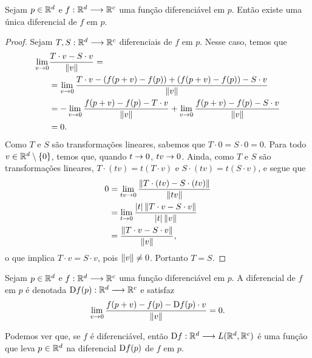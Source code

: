 \begin{prop}
Sejam $p \in \mathbb{R}^d$ e $f:\mathbb{R}^d \longrightarrow \mathbb{R}^c$ uma função diferenciável em $p$. Então existe uma única diferencial de $f$ em $p$.
\end{prop}
\begin{proof}
Sejam $T,S: \mathbb{R}^d \longrightarrow \mathbb{R}^c$ diferenciais de $f$ em $p$. Nesse caso, temos que
	\begin{align*}
	\lim_{v \rightarrow 0} &\frac{T \cdot v - S \cdot v}{\left\Vert{v}\right\Vert} = \\
	&= \lim_{v \rightarrow 0} \frac{T \cdot v - (f(p+v)-f(p)) + (f(p+v)-f(p)) - S \cdot v}{\left\Vert{v}\right\Vert} \\
	& =  -\lim_{v \rightarrow 0} \frac{f(p+v)-f(p) - T \cdot v}{\left\Vert{v}\right\Vert} + \lim_{v \rightarrow 0} \frac{f(p+v)-f(p) - S \cdot v}{\left\Vert{v}\right\Vert} \\
	&=0.
	\end{align*}
Como $T$ e $S$ são transformações lineares, sabemos que $T \cdot 0 = S \cdot 0=0$. Para todo $v \in \mathbb{R}^d \setminus \{0\}$, temos que, quando $t \rightarrow 0$, $tv \rightarrow 0$. Ainda, como $T$ e $S$ são transformações lineares, $T \cdot (tv) = t(T \cdot v)$ e $S \cdot (tv) = t (S \cdot v)$, e segue que
	\begin{align*}
	0 &= \lim_{tv \rightarrow 0} \frac{\left\Vert{T \cdot (tv) - S \cdot (tv)}\right\Vert}{\left\Vert{tv}\right\Vert} \\
		&= \lim_{t \rightarrow 0} \frac{\left\vert{t}\right\vert\left\Vert{T \cdot v - S \cdot v}\right\Vert}{\left\vert{t}\right\vert \left\Vert{v}\right\Vert} \\
		&= \frac{\left\Vert{T \cdot v - S \cdot v}\right\Vert}{\left\Vert{v}\right\Vert},
	\end{align*}
o que implica $T \cdot v = S \cdot v$, pois $\left\Vert{v}\right\Vert \neq 0$. Portanto $T=S$.
\end{proof}

\begin{nota}
Sejam $p \in \mathbb{R}^d$ e $f: \mathbb{R}^d \longrightarrow \mathbb{R}^c$ uma função diferenciável em $p$. A diferencial de $f$ em $p$ é denotada $\mathrm{D} f(p): \mathbb{R}^d \longrightarrow \mathbb{R}^c$ e satisfaz
	\begin{equation*}
	\lim_{v \rightarrow 0} \frac{f(p+v) - f(p) - \mathrm{D} f(p) \cdot v}{\left\Vert{v}\right\Vert} = 0.
	\end{equation*}
\end{nota}

Podemos ver que, se $f$ é diferenciável, então $\mathrm{D} f: \mathbb{R}^d \longrightarrow L(\mathbb{R}^d,\mathbb{R}^c)$ é uma função que leva $p \in \mathbb{R}^d$ na diferencial $\mathrm{D} f(p)$ de $f$ em $p$.

